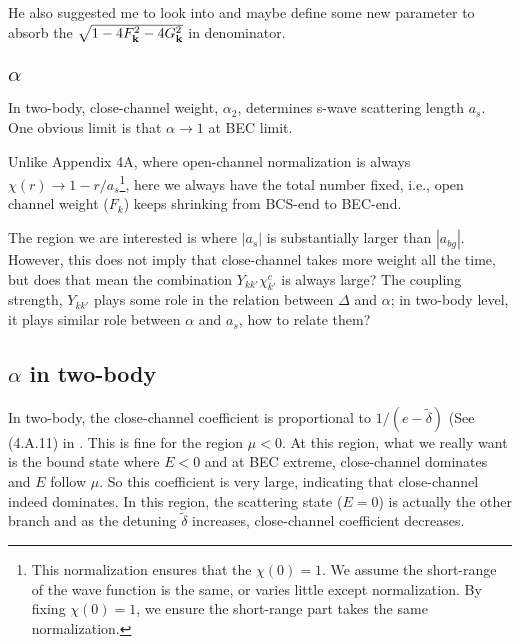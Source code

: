 He also suggested me to look into  and maybe define some new parameter to absorb the $\sqrt{1-4 F_{\mathbf{k}}^2-4 G_{\mathbf{k}}^2}$ in denominator.  

\subsection{$\alpha$}
In two-body, close-channel weight, $\alpha_{2}$, determines s-wave scattering length $a_{s}$.  One obvious limit is that $\alpha\rightarrow1$ at BEC limit.  

Unlike \cite{Leggett} Appendix 4A, where open-channel normalization is always $\chi(r)\rightarrow1-r/a_{s}$\footnote{This normalization ensures that the $\chi(0)=1$.  We assume the short-range of the wave function is the same, or varies little except normalization. By fixing $\chi(0)=1$, we ensure the short-range part takes the same normalization.  }, here we always have the total number fixed, i.e., open channel weight ($F_{k}$) keeps shrinking from BCS-end to BEC-end. 

The region we are interested is where $|a_{s}|$ is substantially larger than $|a_{bg}|$.  However, this does not imply that close-channel takes more weight all the time, but does that mean the combination $Y_{kk'}\chi^{c}_{k'}$ is always large? The coupling strength, $Y_{kk'}$ plays some role in the relation between $\Delta$ and $\alpha$; in two-body level, it plays similar role between $\alpha$ and $a_{s}$, how to relate them?

\subsection{$\alpha$ in two-body}
In two-body, the close-channel coefficient is proportional to $1/(e-\tilde{\delta})$ (See (4.A.11) in \cite{Leggett}.  This is fine for the region $\mu<0$. At this region, what we really want is the bound state where $E<0$ and at BEC extreme, close-channel dominates and $E$ follow $\mu$.  So this coefficient is very large, indicating that close-channel indeed dominates. In this region, the scattering state ($E=0$) is actually the other branch and as the detuning $\tilde{\delta}$ increases, close-channel coefficient decreases.  